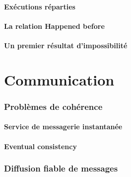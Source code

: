 \subsection{Exécutions réparties}



 
\subsection{La relation Happened before}




 
\subsection{Un premier résultat d'impossibilité}

 
 
\part{Communication}
 
 
\section{Problèmes de cohérence}
 
\subsection{Service de messagerie instantanée}



 
\subsection{Eventual consistency}




 
\section{Diffusion fiable de messages}
 
